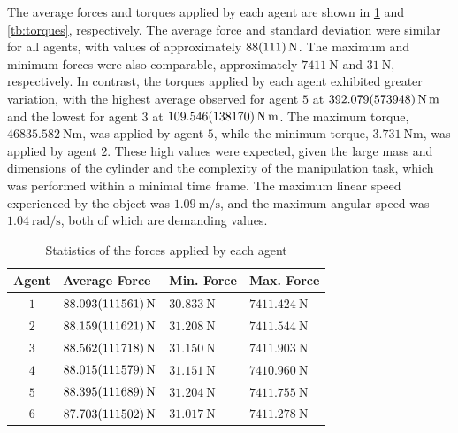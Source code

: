 The average forces and torques applied by each agent are shown in \cref{tb:forces} and \cref{tb:torques}, respectively. The average force and standard deviation were similar for all agents, with values of approximately $\qty{88 \pm 111}{\newton}$. The maximum and minimum forces were also comparable, approximately $\qty{7411}{\newton}$ and $\qty{31}{\newton}$, respectively. In contrast, the torques applied by each agent exhibited greater variation, with the highest average observed for agent $5$ at $\qty{392.079 \pm 573.948}{\newton\meter}$ and the lowest for agent $3$ at $\qty{109.546 \pm 138.17}{\newton\meter}$. The maximum torque, $\qty{46835.582}{\newton\meter}$, was applied by agent $5$, while the minimum torque, $\qty{3.731}{\newton\meter}$, was applied by agent $2$. These high values were expected, given the large mass and dimensions of the cylinder and the complexity of the manipulation task, which was performed within a minimal time frame. The maximum linear speed experienced by the object was $\qty{1.09}{\meter\per\second}$, and the maximum angular speed was $\qty{1.04}{\radian\per\second}$, both of which are demanding values.
\begin{table}[ht]
    \centering
    \caption{Statistics of the forces applied by each agent}\label{tb:forces}
    \begin{tabular}{clll}
    Agent & Average Force & Min. Force & Max. Force\\\hline
    $1$ & $\qty{88.093 \pm 111.561}{\newton}$ & $\qty{30.833}{\newton}$ & $\qty{7411.424}{\newton}$ \\
    $2$ & $\qty{88.159 \pm 111.621}{\newton}$ & $\qty{31.208}{\newton}$ & $\qty{7411.544}{\newton}$ \\
    $3$ & $\qty{88.562 \pm 111.718}{\newton}$ & $\qty{31.150}{\newton}$ & $\qty{7411.903}{\newton}$ \\
    $4$ & $\qty{88.015 \pm 111.579}{\newton}$ & $\qty{31.151}{\newton}$ & $\qty{7410.960}{\newton}$ \\
    $5$ & $\qty{88.395 \pm 111.689}{\newton}$ & $\qty{31.204}{\newton}$ & $\qty{7411.755}{\newton}$ \\
    $6$ & $\qty{87.703 \pm 111.502}{\newton}$ & $\qty{31.017}{\newton}$ & $\qty{7411.278}{\newton}$
    \\\hline
    \end{tabular}
\end{table}
